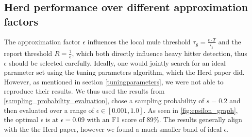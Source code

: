 \documentclass[11pt,oneside,a4paper]{article}
\begin{document}
\subsection{Herd performance over different approximation factors} \label{epsilon_evaluation}


The approximation factor $\epsilon$ influences the local mule threshold $\tau_g = \frac{\epsilon \cdot T}{l_g}$ and the report threshold $R = \frac{1}{\epsilon}$, which both directly influence heavy hitter detection, thus $\epsilon$ should be selected carefully. Ideally, one would jointly search for an ideal parameter set using the tuning parameters algorithm, which the Herd paper did. However, as mentioned in section \ref{tuningparameters}, we were not able to reproduce their results. We thus used the results from \ref{sampling_probability_evaluation}, chose a sampling probability of $s = 0.2$ and then evaluated over a range of $\epsilon \in [0.001, 1.0]$. As seen in \ref{fig:epsilon_graph}, the optimal $\epsilon$ is at $\epsilon = 0.09$ with an F1 score of $89\%$. The results generally align with the the Herd paper, however we found a much smaller band of ideal $\epsilon$.
\end{document}
